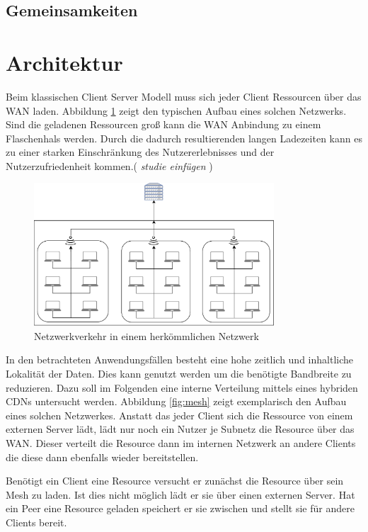 \subsection{Gemeinsamkeiten}

\section{Architektur}

Beim klassischen Client Server Modell muss sich jeder Client Ressourcen über das WAN laden. Abbildung \ref{fig:school} zeigt den typischen Aufbau eines solchen Netzwerks. Sind die geladenen Ressourcen groß kann die WAN Anbindung zu einem Flaschenhals werden. Durch die dadurch resultierenden langen Ladezeiten kann es zu einer starken Einschränkung des Nutzererlebnisses und der Nutzerzufriedenheit kommen.(\emph{\color{red} studie einfügen })

\begin{figure}[!h]
	\centering
	\includegraphics[width=0.8\textwidth]{figures/network_current}
	\caption[A Figure Short-Title]{Netzwerkverkehr in einem herkömmlichen Netzwerk}
	\label{fig:school}
\end{figure}

In den betrachteten Anwendungsfällen besteht eine hohe zeitlich und inhaltliche Lokalität der Daten. Dies kann genutzt werden um die benötigte Bandbreite zu reduzieren. Dazu soll im Folgenden eine interne Verteilung mittels eines hybriden \pTp CDNs untersucht werden. Abbildung \ref{fig:mesh} zeigt exemplarisch den Aufbau eines solchen Netzwerkes. Anstatt das jeder Client sich die Ressource von einem externen Server lädt, lädt nur noch ein Nutzer je Subnetz die Resource über das WAN. Dieser verteilt die Resource dann im internen Netzwerk an andere Clients die diese dann ebenfalls wieder bereitstellen.

Benötigt ein Client eine Resource versucht er zunächst die Resource über sein \pTp Mesh zu laden. Ist dies nicht möglich lädt er sie über einen externen Server. Hat ein Peer eine Resource geladen speichert er sie zwischen und stellt sie für andere Clients bereit.

